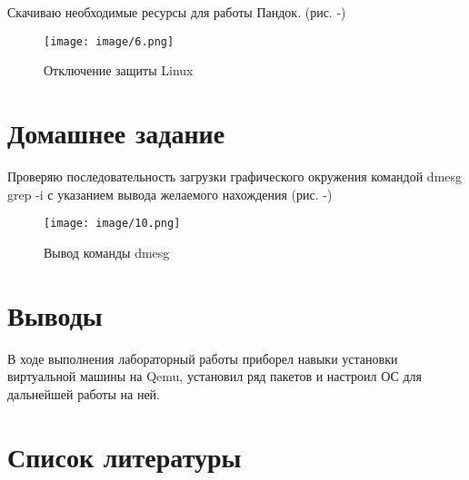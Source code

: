 \documentclass[
  12pt,
  a4paper,
  DIV=11,
  numbers=noendperiod]{scrreprt}
\begin{document}
Скачиваю необходимые ресурсы для работы Пандок. (рис.
-\textcite{fig:006})

\begin{figure}

{\centering \texttt{[image: image/6.png]}

}

\caption{Отключение защиты Linux}

\end{figure}%

\chapter{Домашнее
задание}\label{ux434ux43eux43cux430ux448ux43dux435ux435-ux437ux430ux434ux430ux43dux438ux435}

Проверяю последовательность загрузки графического окружения командой
dmesg \textbar{} grep -i с указанием вывода желаемого нахождения (рис.
-\textcite{fig:010})

\begin{figure}

{\centering \texttt{[image: image/10.png]}

}

\caption{Вывод команды dmesg}

\end{figure}%

\chapter{Выводы}\label{ux432ux44bux432ux43eux434ux44b}

В ходе выполнения лабораторный работы приборел навыки установки
виртуальной машины на Qemu, установил ряд пакетов и настроил ОС для
дальнейшей работы на ней.

\chapter*{Список
литературы}\label{ux441ux43fux438ux441ux43eux43a-ux43bux438ux442ux435ux440ux430ux442ux443ux440ux44b}

\printbibliography[heading=none]
\end{document}
